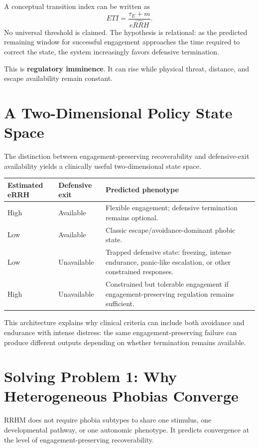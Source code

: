 \documentclass[11pt]{article}
\begin{document}
A conceptual transition index can be written as
\[
ETI=\frac{\tau_E+m}{\widehat{eRRH}}.
\]
No universal threshold is claimed. The hypothesis is relational: as the predicted remaining window for successful engagement approaches the time required to correct the state, the system increasingly favors defensive termination.

This is \textbf{regulatory imminence}. It can rise while physical threat, distance, and escape availability remain constant.

\section{A Two-Dimensional Policy State Space}

The distinction between engagement-preserving recoverability and defensive-exit availability yields a clinically useful two-dimensional state space.

\begin{longtable}{p{}p{}p{}}
\toprule
\textbf{Estimated eRRH} & \textbf{Defensive exit} & \textbf{Predicted phenotype} \\
\midrule
High & Available & Flexible engagement; defensive termination remains optional. \\
Low & Available & Classic escape/avoidance-dominant phobic state. \\
Low & Unavailable & Trapped defensive state: freezing, intense endurance, panic-like escalation, or other constrained responses. \\
High & Unavailable & Constrained but tolerable engagement if engagement-preserving regulation remains sufficient. \\
\bottomrule
\end{longtable}

This architecture explains why clinical criteria can include both avoidance and endurance with intense distress: the same engagement-preserving failure can produce different outputs depending on whether termination remains available.

\section{Solving Problem 1: Why Heterogeneous Phobias Converge}

RRHM does not require phobia subtypes to share one stimulus, one developmental pathway, or one autonomic phenotype. It predicts convergence at the level of engagement-preserving recoverability.
\end{document}
